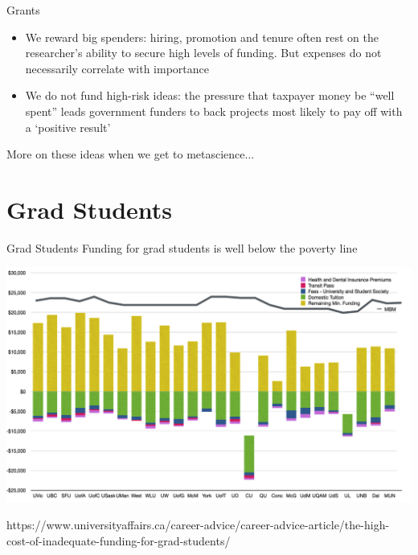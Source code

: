 \documentclass{beamer}
\begin{document}
\begin{frame}{Grants}
	\begin{itemize}
		\item<1-> We reward big spenders: hiring, promotion and tenure often rest on the researcher's ability to secure high levels of funding. But expenses do not necessarily correlate with importance
		\item<2-> We do not fund high-risk ideas: the pressure that taxpayer money be “well spent” leads government funders to back projects most likely to pay off with a `positive result'
	\end{itemize}

	\vspace{10pt}

	More on these ideas when we get to metascience...
\end{frame}


\section{Grad Students}
\begin{frame}{Grad Students}
	Funding for grad students is well below the poverty line
	
	\includegraphics[width=1\textwidth]{../images/gradfundpovertyline.png}
	
	\tiny{https://www.universityaffairs.ca/career-advice/career-advice-article/the-high-cost-of-inadequate-funding-for-grad-students/}

\end{frame}
\end{document}
